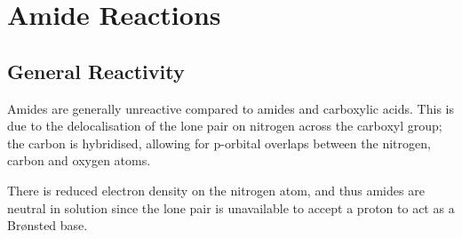 




	\pagebreak
	\section{Amide Reactions}

		\subsection{General Reactivity}

			Amides are generally unreactive compared to amides and carboxylic acids. This is due to the delocalisation of the lone pair
			on nitrogen across the carboxyl group; the carbon is \sptwo{} hybridised, allowing for p-orbital overlaps between the nitrogen,
			carbon and oxygen atoms.

			There is reduced electron density on the nitrogen atom, and thus amides are neutral in solution since the lone pair is unavailable
			to accept a proton to act as a Brønsted base.


